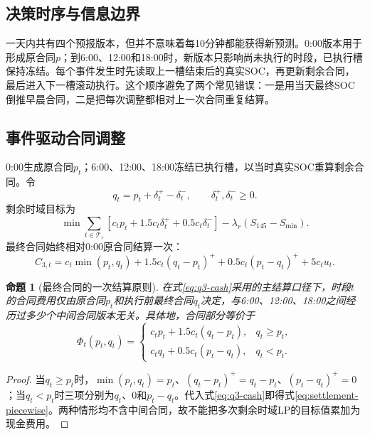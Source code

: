 \documentclass[UTF8,12pt,a4paper]{ctexart}
\newtheorem{proposition}{命题}[section]
\theoremstyle{remark}
\begin{document}
\subsection{决策时序与信息边界}
一天内共有四个预报版本，但并不意味着每10分钟都能获得新预测。0:00版本用于形成原合同$p$；到6:00、12:00和18:00时，新版本只影响尚未执行的时段，已执行槽保持冻结。每个事件发生时先读取上一槽结束后的真实SOC，再更新剩余合同，最后进入下一槽滚动执行。这个顺序避免了两个常见错误：一是用当天最终SOC倒推早晨合同，二是把每次调整都相对上一次合同重复结算。

\subsection{事件驱动合同调整}
0:00生成原合同$p_t$；6:00、12:00、18:00冻结已执行槽，以当时真实SOC重算剩余合同。令
\begin{equation}q_t=p_t+\delta_t^+-\delta_t^-,\qquad\delta_t^+,\delta_t^-\ge0.\label{eq:q3-adjust}\end{equation}
剩余时域目标为
\begin{equation}\min\sum_{t\in\mathcal T_r}[c_tp_t+1.5c_t\delta_t^++0.5c_t\delta_t^-]-\lambda_r(S_{145}-S_{\min}).\label{eq:q3-update-obj}\end{equation}
最终合同始终相对0:00原合同结算一次：
\begin{equation}C_{3,t}=c_t\min(p_t,q_t)+1.5c_t(q_t-p_t)^++0.5c_t(p_t-q_t)^++5c_tu_t.\label{eq:q3-cash}\end{equation}

\begin{proposition}[最终合同的一次结算原则]\label{prop:settlement}
在式\eqref{eq:q3-cash}采用的主结算口径下，时段$t$的合同费用仅由原合同$p_t$和执行前最终合同$q_t$决定，与6:00、12:00、18:00之间经历过多少个中间合同版本无关。具体地，合同部分等价于
\begin{equation}
\Phi_t(p_t,q_t)=
\begin{cases}
c_tp_t+1.5c_t(q_t-p_t),&q_t\ge p_t,\\
c_tq_t+0.5c_t(p_t-q_t),&q_t<p_t.
\end{cases}
\label{eq:settlement-piecewise}
\end{equation}
\end{proposition}
\begin{proof}
当$q_t\ge p_t$时，$\min(p_t,q_t)=p_t$、$(q_t-p_t)^+=q_t-p_t$、$(p_t-q_t)^+=0$；当$q_t<p_t$时三项分别为$q_t$、0和$p_t-q_t$。代入式\eqref{eq:q3-cash}即得式\eqref{eq:settlement-piecewise}。两种情形均不含中间合同，故不能把多次剩余时域LP的目标值累加为现金费用。
\end{proof}
\end{document}
